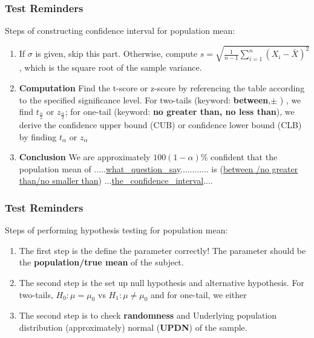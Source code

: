 \documentclass{beamer}
\begin{document}
\begin{frame}
\frametitle{Test Reminders}

Steps of constructing confidence interval for population mean:

\begin{enumerate}
\item If $\sigma$ is given, skip this part. Otherwise, compute $s = \sqrt{\frac{1}{n-1}\sum_{i=1}^n (X_i - \bar X)^2}$, which is the square root of the sample variance.

\item \textbf{Computation} Find the t-score or z-score by referencing the table according to the specified significance level. For two-tails (keyword: \textbf{between},$\pm$ ) , we find $t_{\frac{\alpha}{2}}$ or $z_{\frac{\alpha}{2}}$; for one-tail (keyword: \textbf{no greater than, no less than}), we derive the confidence upper bound (CUB) or confidence lower bound (CLB) by finding $t_{\alpha}$ or $z_{\alpha}$

\item \textbf{Conclusion} We are approximately $100(1-\alpha) \%$ confident that the population mean of .....\underline{what \ question \ say}............ is (\underline{between /no greater than/no smaller than}) ...\underline{the \ confidence \ interval}....

\end{enumerate}
\end{frame}


\begin{frame}
\frametitle{Test Reminders}

Steps of performing hypothesis testing for population mean:

\begin{enumerate}
\item The first step is the define the parameter correctly! The parameter should be the \textbf{population/true mean} of the subject. 

\item The second step is the set up null hypothesis and alternative hypothesis. For two-tails, $H_0: \mu = \mu_0$ vs $H_1: \mu \ne \mu_0$ and for one-tail, we either 

\item The second step is to check \textbf{randomness} and Underlying population distribution (approximately) normal (\textbf{UPDN}) of the sample. 

\end{enumerate}
\end{frame}
\end{document}
